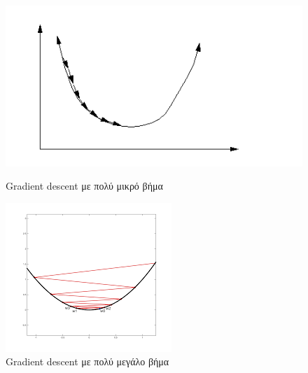 \documentclass{article}
\begin{document}
 \begin{figure}[H]
    \centering
    \begin{minipage}{.5\textwidth}
        \centering
        \includegraphics[width=0.8\linewidth, height=0.15\textheight]{smallstep.png}
        \caption[Gradient descent με πολύ μικρό βήμα]{Gradient descent με πολύ μικρό βήμα}
        
    \end{minipage}%
    \begin{minipage}{0.5\textwidth}
        \centering
        \includegraphics[width=0.8\linewidth, height=0.15\textheight]{bigstep.png}
        \caption[Gradient descent με πολύ μεγάλο βήμα]{Gradient descent με πολύ μεγάλο βήμα}
       
    \end{minipage}
\end{figure}
\end{document}
